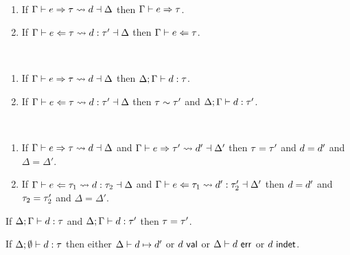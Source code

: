 \begin{theorem}[Correspondence \cy{??}] ~
  \begin{enumerate}
    \item If $\Gamma \vdash e \Rightarrow \tau \leadsto d \dashv \Delta$ then $\Gamma \vdash e \Rightarrow \tau$.
    \item If $\Gamma \vdash e \Leftarrow \tau \leadsto d : \tau' \dashv \Delta$ then $\Gamma \vdash e \Leftarrow \tau$.
  \end{enumerate}
\end{theorem}

\begin{theorem} ~
  \begin{enumerate}
    \item If $\Gamma \vdash e \Rightarrow \tau \leadsto d \dashv \Delta$ then $\Delta; \Gamma \vdash d : \tau$.
    \item If $\Gamma \vdash e \Leftarrow \tau \leadsto d : \tau' \dashv \Delta$ then $\tau \sim \tau'$ and $\Delta; \Gamma \vdash d : \tau'$.
  \end{enumerate}
\end{theorem}

\begin{theorem} ~
  \begin{enumerate}
    \item If $\Gamma \vdash e \Rightarrow \tau \leadsto d \dashv \Delta$ and $\Gamma \vdash e \Rightarrow \tau' \leadsto d' \dashv \Delta'$ then $\tau=\tau'$ and $d=d'$ and $\Delta=\Delta'$.
    \item If $\Gamma \vdash e \Leftarrow \tau_1 \leadsto d : \tau_2 \dashv \Delta$ and $\Gamma \vdash e \Leftarrow \tau_1 \leadsto d' : \tau_2' \dashv \Delta'$ then $d=d'$ and $\tau_2=\tau_2'$ and $\Delta=\Delta'$.
  \end{enumerate}
\end{theorem}

\begin{theorem}
If $\Delta; \Gamma \vdash d : \tau$ and $\Delta; \Gamma \vdash d : \tau'$ then $\tau=\tau'$.
\end{theorem}

\begin{theorem}[Progress]
If $\Delta; \emptyset \vdash d : \tau$ then either $\Delta \vdash d \mapsto d'$ or 
$d~\mathsf{val}$ or $\Delta \vdash d~\mathsf{err}$ or $d~\mathsf{indet}$. 
\end{theorem}

